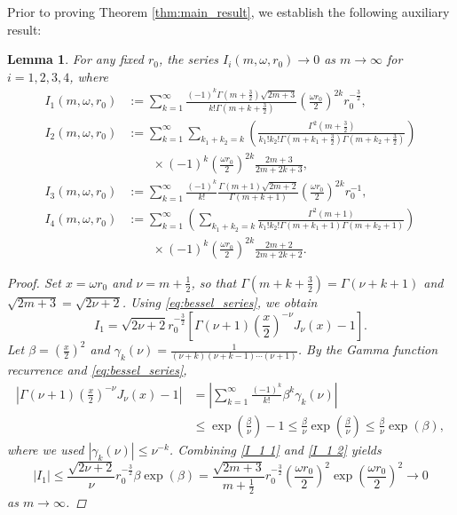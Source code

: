 \documentclass[11pt,reqno,oneside]{amsart}
\numberwithin{equation}{section}
\newtheorem{lemma}[theorem]{Lemma}
\theoremstyle{definition}
\theoremstyle{remark}
\numberwithin{equation}{section}
\begin{document}
	Prior to proving Theorem \ref{thm:main_result}, we establish the following auxiliary result:
	\begin{lemma}\label{I_1,I_2,I_3,I_4}
		For any fixed $r_0$, the series $I_{i}(m,\omega,r_0)\rightarrow 0$ as $m \rightarrow \infty$ for $i=1,2,3,4$, where
		\begin{align*}
			I_1(m,\omega ,r_0) &:= \sum_{k=1}^{\infty}\frac{(-1)^k\Gamma(m+\frac{3}{2})\sqrt{2m+3} }{k!\Gamma(m+k+\frac{3}{2})}\left(\frac{\omega r_0}{2}\right)^{2k}r_0^{-\frac{3}{2}}, \\
			I_2(m,\omega,r_0) &:= \sum_{k=1}^{\infty}\sum_{k_1+k_2=k}\left(\frac{\Gamma^2(m+\frac{3}{2})}{k_1!k_2!\Gamma(m+k_1+\frac{3}{2})\Gamma(m+k_2+\frac{3}{2})}\right)  \\
			& \qquad \times(-1)^k\left(\frac{\omega r_0}{2}\right)^{2k}\frac{2m+3}{2m+2k+3}, \\
			I_3(m,\omega,r_0) &:= \sum_{k=1}^{\infty}\frac{(-1)^k}{k!}\frac{\Gamma(m+1)\sqrt{2m+2}}{\Gamma(m+k+1)}\left(\frac{\omega r_0}{2}\right)^{2k}r^{-1}_0, \\
			I_4(m,\omega,r_0) &:= \sum_{k=1}^{\infty}\left(\sum_{k_1+k_2=k}\frac{\Gamma^{2}(m+1)}{k_1!k_2!\Gamma(m+k_1+1)\Gamma(m+k_2+1)}\right) \nonumber \\
			& \qquad \times(-1)^k\left(\frac{\omega r_0}{2}\right)^{2k}\frac{2m+2}{2m+2k+2}.
		\end{align*}
		\begin{proof}
			Set $x=\omega r_0$ and $\nu=m+\frac{1}{2}$, so that $\Gamma(m+k+\frac{3}{2})=\Gamma(\nu+k+1)$ and $\sqrt{2m+3}=\sqrt{2\nu+2}$. Using \eqref{eq:bessel_series}, we obtain
			\begin{equation}\label{I_1 1}
				I_1=\sqrt{2\nu +2} r_0^{-\frac{3}{2}}[\Gamma(\nu+1)(\frac{x}{2})^{-\nu}J_{\nu}(x)-1].
			\end{equation}
			Let $\beta=(\frac{x}{2})^2$ and $\gamma_k(\nu)=\frac{1}{(\nu+k)(\nu+k-1)\cdots(\nu+1)}$. By the Gamma function recurrence and \eqref{eq:bessel_series},
			\begin{equation}\label{I_1 2}
				\begin{aligned}
					|\Gamma(\nu+1)(\frac{x}{2})^{-\nu}J_{\nu}(x)-1|&=|\sum_{k=1}^{\infty}\frac{(-1)^k}{k!}\beta^k\gamma_k(\nu)|\\
					&\leqslant\exp(\frac{\beta}{\nu})-1\leqslant \frac{\beta}{\nu}\exp(\frac{\beta}{\nu})\leqslant \frac{\beta}{\nu}\exp(\beta),
				\end{aligned}
			\end{equation}
			where we used $|\gamma_k(\nu)|\leqslant \nu^{-k}$. Combining \eqref{I_1 1} and \eqref{I_1 2} yields
			\begin{equation*}
				|I_1|\leqslant \frac{\sqrt{2\nu +2}}{\nu} r_0^{-\frac{3}{2}}\beta\exp(\beta) =\frac{\sqrt{2m +3}}{m+\frac{1}{2}} r_0^{-\frac{3}{2}}(\frac{\omega r_0}{2})^2\exp(\frac{\omega r_0}{2})^2\rightarrow 0 
			\end{equation*}
			as $m \rightarrow \infty$.
			

\end{proof}
\end{lemma}
\end{document}
